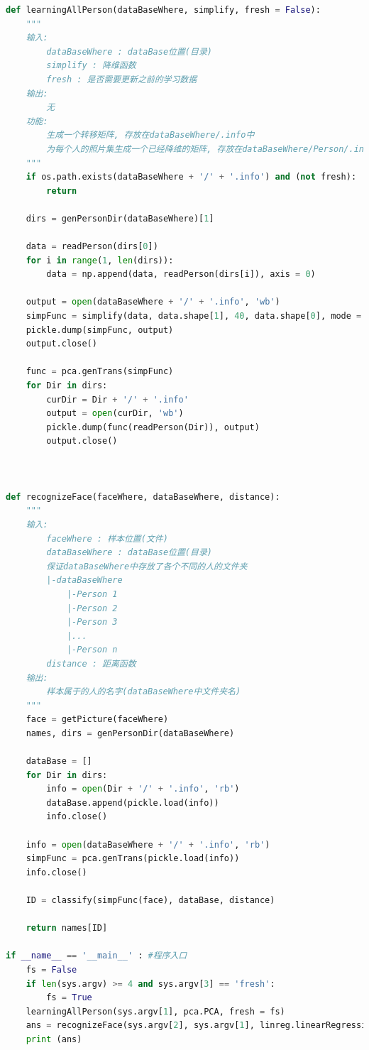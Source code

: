 \documentclass[fleqn,10pt]{SelfArx} %
\begin{document}
\begin{lstlisting}[language=python]
def learningAllPerson(dataBaseWhere, simplify, fresh = False):
    """
    输入: 
        dataBaseWhere : dataBase位置(目录)
        simplify : 降维函数
        fresh : 是否需要更新之前的学习数据
    输出:
        无
    功能:
        生成一个转移矩阵, 存放在dataBaseWhere/.info中
        为每个人的照片集生成一个已经降维的矩阵, 存放在dataBaseWhere/Person/.info中
    """
    if os.path.exists(dataBaseWhere + '/' + '.info') and (not fresh):
        return

    dirs = genPersonDir(dataBaseWhere)[1]

    data = readPerson(dirs[0])
    for i in range(1, len(dirs)):
        data = np.append(data, readPerson(dirs[i]), axis = 0)

    output = open(dataBaseWhere + '/' + '.info', 'wb')
    simpFunc = simplify(data, data.shape[1], 40, data.shape[0], mode = 'func')
    pickle.dump(simpFunc, output)
    output.close()

    func = pca.genTrans(simpFunc)
    for Dir in dirs:
        curDir = Dir + '/' + '.info'
        output = open(curDir, 'wb')
        pickle.dump(func(readPerson(Dir)), output)
        output.close()



def recognizeFace(faceWhere, dataBaseWhere, distance):
    """
    输入: 
        faceWhere : 样本位置(文件)
        dataBaseWhere : dataBase位置(目录)
        保证dataBaseWhere中存放了各个不同的人的文件夹
        |-dataBaseWhere
            |-Person 1
            |-Person 2
            |-Person 3
            |...
            |-Person n
        distance : 距离函数
    输出:
        样本属于的人的名字(dataBaseWhere中文件夹名)
    """
    face = getPicture(faceWhere)
    names, dirs = genPersonDir(dataBaseWhere)

    dataBase = []
    for Dir in dirs:
        info = open(Dir + '/' + '.info', 'rb')
        dataBase.append(pickle.load(info))
        info.close()

    info = open(dataBaseWhere + '/' + '.info', 'rb')
    simpFunc = pca.genTrans(pickle.load(info))
    info.close()

    ID = classify(simpFunc(face), dataBase, distance)

    return names[ID]

if __name__ == '__main__' : #程序入口
    fs = False
    if len(sys.argv) >= 4 and sys.argv[3] == 'fresh':
        fs = True
    learningAllPerson(sys.argv[1], pca.PCA, fresh = fs)
    ans = recognizeFace(sys.argv[2], sys.argv[1], linreg.linearRegression)
    print (ans)
\end{lstlisting}
\end{document}
